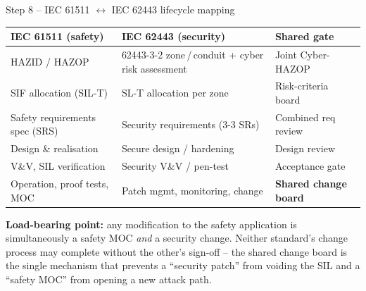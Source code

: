 \documentclass[11pt,a4paper]{article}
\begin{document}
\begin{solutionbox}{Step 8 -- IEC 61511 $\leftrightarrow$ IEC 62443 lifecycle mapping}
\vspace{1pt}\footnotesize
\renewcommand{\arraystretch}{1.2}\setlength{\tabcolsep}{4pt}
\begin{tabular}{@{}p{52mm}p{56mm}p{38mm}@{}}
\toprule
\textbf{IEC 61511 (safety)} & \textbf{IEC 62443 (security)} & \textbf{Shared gate} \\
\midrule
HAZID / HAZOP & 62443-3-2 zone\,/\,conduit + cyber risk assessment & Joint Cyber-HAZOP \\
SIF allocation (SIL-T) & SL-T allocation per zone & Risk-criteria board \\
Safety requirements spec (SRS) & Security requirements (3-3 SRs) & Combined req review \\
Design \& realisation & Secure design / hardening & Design review \\
V\&V, SIL verification & Security V\&V / pen-test & Acceptance gate \\
Operation, proof tests, MOC & Patch mgmt, monitoring, change & \textbf{Shared change board} \\
\bottomrule
\end{tabular}
\normalsize
\par\vspace{2mm}
\textbf{Load-bearing point:} any modification to the safety application is
simultaneously a safety MOC \emph{and} a security change. Neither standard's
change process may complete without the other's sign-off -- the shared change
board is the single mechanism that prevents a ``security patch'' from voiding
the SIL and a ``safety MOC'' from opening a new attack path.
\end{solutionbox}
\end{document}
